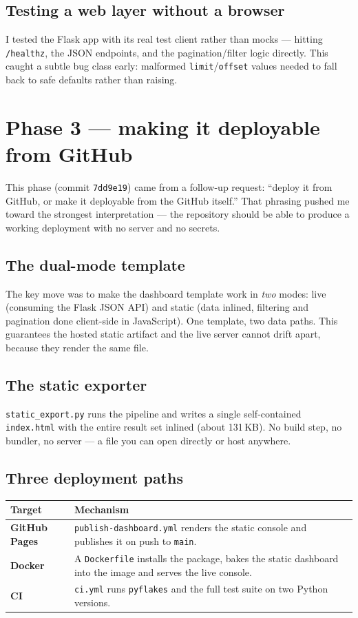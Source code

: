 \documentclass[11pt,a4paper]{article}
\newcommand{\code}[1]{\texttt{\small #1}}
\begin{document}
\subsection{Testing a web layer without a browser}
I tested the Flask app with its real test client rather than mocks --- hitting
\code{/healthz}, the JSON endpoints, and the pagination/filter logic directly.
This caught a subtle bug class early: malformed \code{limit}/\code{offset}
values needed to fall back to safe defaults rather than raising.

\section{Phase 3 --- making it deployable from GitHub}

This phase (commit \texttt{7dd9e19}) came from a follow-up request: ``deploy it
from GitHub, or make it deployable from the GitHub itself.'' That phrasing
pushed me toward the strongest interpretation --- the repository should be able
to produce a working deployment with no server and no secrets.

\subsection{The dual-mode template}
The key move was to make the dashboard template work in \emph{two} modes: live
(consuming the Flask JSON API) and static (data inlined, filtering and
pagination done client-side in JavaScript). One template, two data paths. This
guarantees the hosted static artifact and the live server cannot drift apart,
because they render the same file.

\subsection{The static exporter}
\code{static\_export.py} runs the pipeline and writes a single self-contained
\code{index.html} with the entire result set inlined (about 131\,KB). No build
step, no bundler, no server --- a file you can open directly or host anywhere.

\subsection{Three deployment paths}
\begin{center}
\begin{tabularx}{\linewidth}{@{}>{\bfseries}p{3.5cm}X@{}}
\toprule
\rowcolor{paper}\textbf{Target} & \textbf{Mechanism} \\
\midrule
GitHub Pages & \code{publish-dashboard.yml} renders the static console and publishes it on push to \code{main}. \\
Docker & A \code{Dockerfile} installs the package, bakes the static dashboard into the image and serves the live console. \\
CI & \code{ci.yml} runs \code{pyflakes} and the full test suite on two Python versions. \\
\bottomrule
\end{tabularx}
\end{center}
\end{document}
